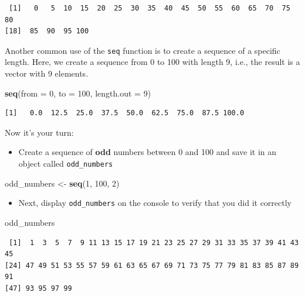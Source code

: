 \documentclass[]{article}
\newenvironment{Shaded}{\begin{snugshade}}{\end{snugshade}}
\newcommand{\DataTypeTok}[1]{\textcolor[rgb]{0.13,0.29,0.53}{#1}}
\newcommand{\DecValTok}[1]{\textcolor[rgb]{0.00,0.00,0.81}{#1}}
\newcommand{\KeywordTok}[1]{\textcolor[rgb]{0.13,0.29,0.53}{\textbf{#1}}}
\newcommand{\NormalTok}[1]{#1}
\newcommand{\StringTok}[1]{\textcolor[rgb]{0.31,0.60,0.02}{#1}}
\providecommand{\tightlist}{%
  \setlength{\itemsep}{0pt}\setlength{\parskip}{0pt}}
\begin{document}
\begin{verbatim}
 [1]   0   5  10  15  20  25  30  35  40  45  50  55  60  65  70  75  80
[18]  85  90  95 100
\end{verbatim}

Another common use of the \texttt{seq} function is to create a sequence of a specific length. Here, we create a sequence from 0 to 100 with length 9, i.e., the result is a vector with 9 elements.

\begin{Shaded}
\begin{Highlighting}[]
\KeywordTok{seq}\NormalTok{(}\DataTypeTok{from =} \DecValTok{0}\NormalTok{, }\DataTypeTok{to =} \DecValTok{100}\NormalTok{, }\DataTypeTok{length.out =}  \DecValTok{9}\NormalTok{)}
\end{Highlighting}
\end{Shaded}

\begin{verbatim}
[1]   0.0  12.5  25.0  37.5  50.0  62.5  75.0  87.5 100.0
\end{verbatim}

Now it's your turn:

\begin{itemize}
\tightlist
\item
  Create a sequence of \textbf{odd} numbers between 0 and 100 and save it in an object called \texttt{odd\_numbers}
\end{itemize}

\begin{Shaded}
\begin{Highlighting}[]
\NormalTok{odd_numbers <-}\StringTok{ }\KeywordTok{seq}\NormalTok{(}\DecValTok{1}\NormalTok{, }\DecValTok{100}\NormalTok{, }\DecValTok{2}\NormalTok{)}
\end{Highlighting}
\end{Shaded}

\begin{itemize}
\tightlist
\item
  Next, display \texttt{odd\_numbers} on the console to verify that you did it correctly
\end{itemize}

\begin{Shaded}
\begin{Highlighting}[]
\NormalTok{odd_numbers}
\end{Highlighting}
\end{Shaded}

\begin{verbatim}
 [1]  1  3  5  7  9 11 13 15 17 19 21 23 25 27 29 31 33 35 37 39 41 43 45
[24] 47 49 51 53 55 57 59 61 63 65 67 69 71 73 75 77 79 81 83 85 87 89 91
[47] 93 95 97 99
\end{verbatim}
\end{document}
